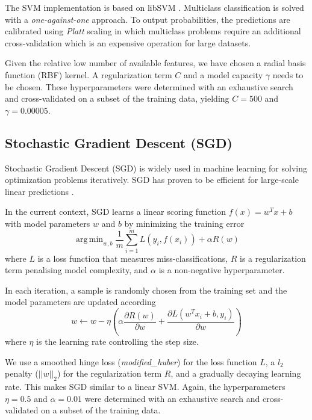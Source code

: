 \documentclass[journal]{IEEEtran}
\DeclareMathOperator*{\argmin}{arg\,min}
\begin{document}
The SVM implementation is based on libSVM \cite{chang2011libsvm}. Multiclass classification is solved with a \textit{one-against-one} approach. To output probabilities, the predictions are calibrated using \textit{Platt} scaling in which multiclass problems require an additional cross-validation which is an expensive operation for large datasets.

Given the relative low number of available features, we have chosen a radial basis function (RBF) kernel. A regularization term $C$ and a model capacity $\gamma$ needs to be chosen. These hyperparameters were determined with an exhaustive search and cross-validated on a subset of the training data, yielding $C=500$ and $\gamma=0.00005$.

\subsection{Stochastic Gradient Descent (SGD)}
Stochastic Gradient Descent (SGD) is widely used in machine learning for solving optimization problems iteratively. SGD has proven to be efficient for large-scale linear predictions \cite{zhang2004solving}.

In the current context, SGD learns a linear scoring function $f(x) = w^Tx + b$ with model parameters $w$ and $b$ by minimizing the training error
\begin{equation}
\argmin_{w,b} \frac{1}{m}\sum_{i=1}^mL(y_i, f(x_i)) + \alpha R(w)
\end{equation}
where $L$ is a loss function that measures miss-classifications, $R$ is a regularization term penalising model complexity, and $\alpha$ is a non-negative hyperparameter.

In each iteration, a sample is randomly chosen from the training set and the model parameters are updated according
\begin{equation}
w \leftarrow w - \eta \left(\alpha \frac{\partial R(w)}{\partial w} + \frac{\partial L (w^Tx_i + b, y_i)}{\partial w} \right)
\end{equation}
where $\eta$ is the learning rate controlling the step size.

We use a smoothed hinge loss (\textit{modified\_huber}) for the loss function $L$, a $l_2$ penalty ($||w||_2$) for the regularization term $R$, and a gradually decaying learning rate. This makes SGD similar to a linear SVM. Again, the hyperparameters $\eta = 0.5$ and $\alpha = 0.01$ were determined with an exhaustive search and cross-validated on a subset of the training data.
\end{document}

